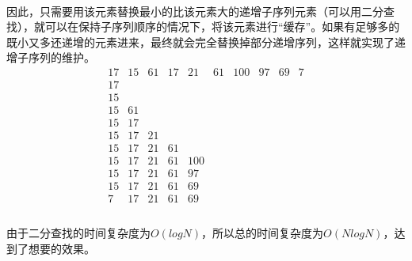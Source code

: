 \documentclass[UTF-8, 12pt]{ctexart}
\begin{document}
    \paragraph{}
    因此，只需要用该元素替换最小的比该元素大的递增子序列元素（可以用二分查找），就可以在保持子序列顺序的情况下，将该元素进行“缓存”。如果有足够多的既小又多还递增的元素进来，最终就会完全替换掉部分递增序列，这样就实现了递增子序列的维护。
    \begin{equation}
	\begin{array}{cccccccccc}
	17 & 15 & 61 & 17 & 21 & 61 & 100 & 97 & 69 & 7\\
	17 \\
	15 \\
	15 & 61 \\
	15 & 17 \\
	15 & 17 & 21 \\
	15 & 17 & 21 & 61 \\
	15 & 17 & 21 & 61 & 100 \\
	15 & 17 & 21 & 61 & 97 \\
	15 & 17 & 21 & 61 & 69 \\
	7  & 17 & 21 & 61 & 69\\
	\end{array}
    \end{equation}
    \paragraph{}
    由于二分查找的时间复杂度为$O(logN)$，所以总的时间复杂度为$O(NlogN)$，达到了想要的效果。
    
\end{document}
